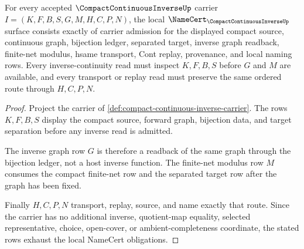 \begin{theorem}
\label{thm:compact-continuous-inverse-namecert-obligations}
For every accepted $\CompactContinuousInverseUp$ carrier $I=(K,F,B,S,G,M,H,C,P,N)$, the local $\NameCert_{\CompactContinuousInverseUp}$ surface consists exactly of carrier admission for the displayed compact source, continuous graph, bijection ledger, separated target, inverse graph readback, finite-net modulus, hsame transport, Cont replay, provenance, and local naming rows. Every inverse-continuity read must inspect $K,F,B,S$ before $G$ and $M$ are available, and every transport or replay read must preserve the same ordered route through $H,C,P,N$.
\end{theorem}
\begin{proof}
Project the carrier of \autoref{def:compact-continuous-inverse-carrier}. The rows $K,F,B,S$ display the compact source, forward graph, bijection data, and target separation before any inverse read is admitted.

The inverse graph row $G$ is therefore a readback of the same graph through the bijection ledger, not a host inverse function. The finite-net modulus row $M$ consumes the compact finite-net row and the separated target row after the graph has been fixed.

Finally $H,C,P,N$ transport, replay, source, and name exactly that route. Since the carrier has no additional inverse, quotient-map equality, selected representative, choice, open-cover, or ambient-completeness coordinate, the stated rows exhaust the local NameCert obligations.
\end{proof}

